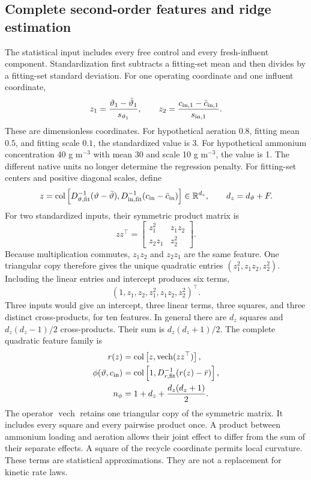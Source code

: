 \subsection{Complete second-order features and ridge estimation}

The statistical input includes every free control and every fresh-influent component. Standardization first subtracts a fitting-set mean and then divides by a fitting-set standard deviation. For one operating coordinate and one influent coordinate,
\begin{equation}
z_1=\frac{\vartheta_1-\bar\vartheta_1}{s_{\vartheta_1}},\qquad
z_2=\frac{c_{{\rm in},1}-\bar c_{{\rm in},1}}{s_{{\rm in},1}}.
\end{equation}
These are dimensionless coordinates. For hypothetical aeration $0.8$, fitting mean $0.5$, and fitting scale $0.1$, the standardized value is 3. For hypothetical ammonium concentration 40 g m$^{-3}$ with mean 30 and scale 10 g m$^{-3}$, the value is 1. The different native units no longer determine the regression penalty. For fitting-set centers and positive diagonal scales, define
\begin{equation}
z=\operatorname{col}\left[D_{\vartheta,\rm fit}^{-1}(\vartheta-\bar\vartheta),
D_{{\rm in},\rm fit}^{-1}(c_{\rm in}-\bar c_{\rm in})\right]
\in\mathbb R^{d_z},\qquad d_z=d_\vartheta+F.
\label{eq:plant_standardized_input}
\end{equation}
For two standardized inputs, their symmetric product matrix is
\begin{equation}
zz^\top=\begin{bmatrix}z_1^2&z_1z_2\\z_2z_1&z_2^2\end{bmatrix}.
\end{equation}
Because multiplication commutes, $z_1z_2$ and $z_2z_1$ are the same feature. One triangular copy therefore gives the unique quadratic entries $(z_1^2,z_1z_2,z_2^2)$. Including the linear entries and intercept produces six terms,
\begin{equation}
(1,z_1,z_2,z_1^2,z_1z_2,z_2^2)^\top.
\end{equation}
Three inputs would give an intercept, three linear terms, three squares, and three distinct cross-products, for ten features. In general there are $d_z$ squares and $d_z(d_z-1)/2$ cross-products. Their sum is $d_z(d_z+1)/2$. The complete quadratic feature family is
\begin{align}
r(z)&=\operatorname{col}\left[z,\operatorname{vech}(zz^\top)\right],\\
\phi(\vartheta,c_{\rm in})&=\operatorname{col}\left[1,D_{r,\rm fit}^{-1}(r(z)-\bar r)\right],\\
n_\phi&=1+d_z+\frac{d_z(d_z+1)}{2}.
\label{eq:plant_features}
\end{align}
The operator $\operatorname{vech}$ retains one triangular copy of the symmetric matrix. It includes every square and every pairwise product once. A product between ammonium loading and aeration allows their joint effect to differ from the sum of their separate effects. A square of the recycle coordinate permits local curvature. These terms are statistical approximations. They are not a replacement for kinetic rate laws.

